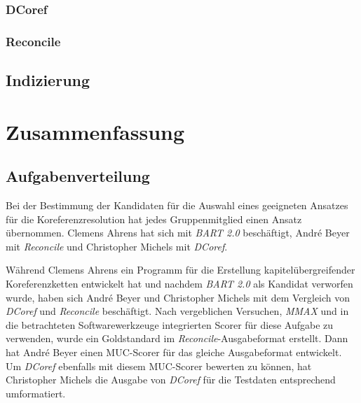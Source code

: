 \documentclass[a4paper,12pt,titlepage=true, ngerman]{scrartcl}
\begin{document}

\subsubsection{DCoref}%





\subsubsection{Reconcile}%


\subsection{Indizierung}\label{Indizierung}




\newpage

\section{Zusammenfassung}%



\subsection{Aufgabenverteilung}%

Bei der Bestimmung der Kandidaten für die Auswahl eines geeigneten Ansatzes für die Koreferenzresolution 
hat jedes Gruppenmitglied einen Ansatz übernommen. 
Clemens Ahrens hat sich mit \emph{BART 2.0} beschäftigt, André Beyer mit \emph{Reconcile} und 
Christopher Michels mit \emph{DCoref}.

Während Clemens Ahrens ein Programm für die Erstellung kapitelübergreifender Koreferenzketten entwickelt hat 
und nachdem \emph{BART 2.0} als Kandidat verworfen wurde, 
haben sich André Beyer und Christopher Michels mit dem Vergleich von \emph{DCoref} 
und \emph{Reconcile} beschäftigt. 
Nach vergeblichen Versuchen, \emph{MMAX} und in die betrachteten Softwarewerkzeuge integrierten Scorer 
für diese Aufgabe zu verwenden, wurde ein Goldstandard im \emph{Reconcile}-Ausgabeformat erstellt. 
Dann hat André Beyer einen MUC-Scorer für das gleiche Ausgabeformat entwickelt. 
Um \emph{DCoref} ebenfalls mit diesem MUC-Scorer bewerten zu können, 
hat Christopher Michels die Ausgabe von \emph{DCoref} für die Testdaten entsprechend umformatiert.
\end{document}

